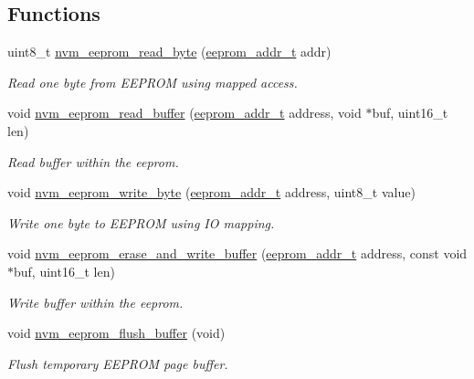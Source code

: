 \subsection*{Functions}
\begin{DoxyCompactItemize}
\item 
uint8\-\_\-t \hyperlink{group__nvm__eeprom__group_ga5f2c4c625ef21cd65891d480f7e6e6b6}{nvm\-\_\-eeprom\-\_\-read\-\_\-byte} (\hyperlink{group__nvm__eeprom__group_ga9adfe2ae9400336ec4a715b2db1c3e79}{eeprom\-\_\-addr\-\_\-t} addr)
\begin{DoxyCompactList}\small\item\em Read one byte from E\-E\-P\-R\-O\-M using mapped access. \end{DoxyCompactList}\item 
void \hyperlink{group__nvm__eeprom__group_ga723a1c1ef60ffb4d220f28c99e6c3014}{nvm\-\_\-eeprom\-\_\-read\-\_\-buffer} (\hyperlink{group__nvm__eeprom__group_ga9adfe2ae9400336ec4a715b2db1c3e79}{eeprom\-\_\-addr\-\_\-t} address, void $\ast$buf, uint16\-\_\-t len)
\begin{DoxyCompactList}\small\item\em Read buffer within the eeprom. \end{DoxyCompactList}\item 
void \hyperlink{group__nvm__eeprom__group_ga683292d1a734f3222e18720ac66f2315}{nvm\-\_\-eeprom\-\_\-write\-\_\-byte} (\hyperlink{group__nvm__eeprom__group_ga9adfe2ae9400336ec4a715b2db1c3e79}{eeprom\-\_\-addr\-\_\-t} address, uint8\-\_\-t value)
\begin{DoxyCompactList}\small\item\em Write one byte to E\-E\-P\-R\-O\-M using I\-O mapping. \end{DoxyCompactList}\item 
void \hyperlink{group__nvm__eeprom__group_gac913bbba11570b56b639682e7edf8327}{nvm\-\_\-eeprom\-\_\-erase\-\_\-and\-\_\-write\-\_\-buffer} (\hyperlink{group__nvm__eeprom__group_ga9adfe2ae9400336ec4a715b2db1c3e79}{eeprom\-\_\-addr\-\_\-t} address, const void $\ast$buf, uint16\-\_\-t len)
\begin{DoxyCompactList}\small\item\em Write buffer within the eeprom. \end{DoxyCompactList}\item 
void \hyperlink{group__nvm__eeprom__group_ga309765606eafd344378f1ddd20fc4129}{nvm\-\_\-eeprom\-\_\-flush\-\_\-buffer} (void)
\begin{DoxyCompactList}\small\item\em Flush temporary E\-E\-P\-R\-O\-M page buffer. \end{DoxyCompactList}\item 

\end{DoxyCompactItemize}

